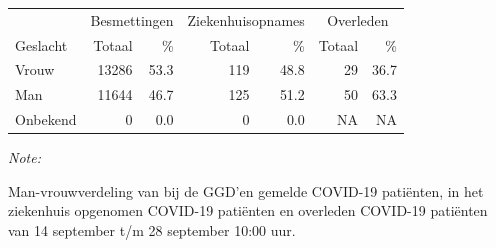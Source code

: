 \documentclass[
  english,
  man,floatsintext]{apa6}
\begin{document}
\begin{table}
\centering\begingroup\fontsize{11}{13}\selectfont

\begin{threeparttable}
\begin{tabular}{lrrrrrr}
\toprule
\multicolumn{1}{c}{ } & \multicolumn{2}{c}{Besmettingen} & \multicolumn{2}{c}{Ziekenhuisopnames} & \multicolumn{2}{c}{Overleden} \\
\cmidrule(l{3pt}r{3pt}){2-3} \cmidrule(l{3pt}r{3pt}){4-5} \cmidrule(l{3pt}r{3pt}){6-7}
Geslacht & Totaal & \% & Totaal & \% & Totaal & \%\\
\midrule
Vrouw & 13286 & 53.3 & 119 & 48.8 & 29 & 36.7\\
Man & 11644 & 46.7 & 125 & 51.2 & 50 & 63.3\\
Onbekend & 0 & 0.0 & 0 & 0.0 & NA & NA\\
\bottomrule
\end{tabular}
\begin{tablenotes}
\item \textit{Note: } 
\item Man-vrouwverdeling van bij de GGD’en gemelde COVID-19 patiënten, in het ziekenhuis opgenomen COVID-19 patiënten en overleden COVID-19 patiënten van 14 september t/m 28 september 10:00 uur.
\end{tablenotes}
\end{threeparttable}
\endgroup{}
\end{table}
\newpage
\end{document}
